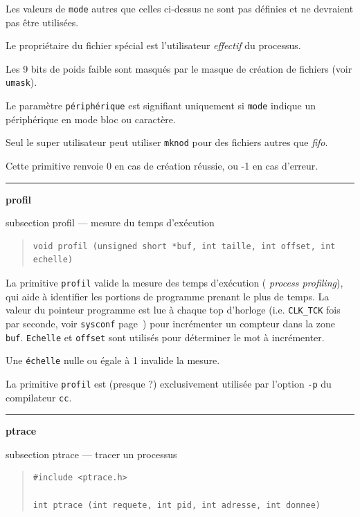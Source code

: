 \documentclass [twoside] {report}
\newcommand {\primitive} [1]
    {
	\phantomsection
	{\large \textbf {#1}}
	\addcontentsline {toc} {subsection} {#1}
    }
\newcommand {\separation}
    {
	\vspace {5mm}
	\nopagebreak
	\hrule
    }
\begin{document}
Les valeurs de \texttt {mode} autres que celles
ci-dessus ne sont pas définies et ne devraient pas
être utilisées.

Le propriétaire du fichier spécial est
l'utilisateur \textit {effectif} du processus.

Les 9 bits de poids faible sont masqués par le
masque de création de fichiers (voir \texttt {umask}).

Le paramètre \texttt {périphérique} est signifiant
uniquement si \texttt {mode} indique un périphérique en
mode bloc ou caractère.

Seul le super utilisateur peut utiliser \texttt {mknod}
pour des fichiers autres que \textit {fifo}.

Cette primitive renvoie 0 en cas de création
réussie, ou -1 en cas d'erreur.




\separation
\primitive {profil} --- mesure du temps d'exécution

\begin {quote}
\begin {verbatim}
void profil (unsigned short *buf, int taille, int offset, int echelle)
\end{verbatim}
\end {quote}

La primitive \texttt {profil} valide la mesure des temps d'exécution ({\it
process profiling}), qui aide à identifier les portions de programme
prenant le plus de temps. La valeur du pointeur programme est lue à
chaque top d'horloge (i.e. \texttt {CLK\_TCK} fois par seconde, voir
\texttt {sysconf} page~\pageref {sysconf}) pour incrémenter un compteur dans
la zone \texttt {buf}. \texttt {Echelle} et \texttt {offset} sont utilisés pour
déterminer le mot à incrémenter.

Une \texttt {échelle} nulle ou égale à 1 invalide la
mesure.

La primitive \texttt {profil} est (presque ?) exclusivement
utilisée par l'option \texttt {-p} du compilateur \texttt {cc}.




\separation
\primitive {ptrace} --- tracer un processus

\begin {quote}
\begin {verbatim}
#include <ptrace.h>

int ptrace (int requete, int pid, int adresse, int donnee)
\end{verbatim}
\end {quote}
\end{document}
